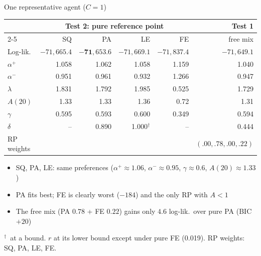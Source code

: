 \documentclass[aspectratio=169,11pt]{beamer}
\newcommand{\ap}{\alpha^{+}}
\newcommand{\am}{\alpha^{-}}
\newcommand{\bd}{\ensuremath{^{\dagger}}}
\newcommand{\tabnote}[1]{\par\vfill{\scriptsize\color{muted}#1\par}}
\newcommand{\tight}{\setlength{\itemsep}{3pt}}
\begin{document}
\begin{frame}{One representative agent ($C=1$)}
{\centering\footnotesize
\begin{tabular}{l rrrr r}
\toprule
& \multicolumn{4}{c}{Test 2: pure reference point} & Test 1\\
\cmidrule(lr){2-5}
& SQ & PA & LE & FE & free mix\\
\midrule
Log-lik. & $-71{,}665.4$ & $\mathbf{-71{,}653.6}$ & $-71{,}669.1$ & $-71{,}837.4$ & $-71{,}649.1$\\
$\ap$ & 1.058 & 1.062 & 1.058 & 1.159 & 1.040\\
$\am$ & 0.951 & 0.961 & 0.932 & 1.266 & 0.947\\
$\lambda$ & 1.831 & 1.792 & 1.985 & 0.525 & 1.729\\
$A(20)$ & 1.33 & 1.33 & 1.36 & 0.72 & 1.31\\
$\gamma$ & 0.595 & 0.593 & 0.600 & 0.349 & 0.594\\
$\delta$ & -- & 0.890 & 1.000\bd & -- & 0.444\\
RP weights & & & & & $(.00,.78,.00,.22)$\\
\bottomrule
\end{tabular}\par}
\begin{itemize}\small\tight
  \item SQ, PA, LE: same preferences ($\ap\approx 1.06$, $\am\approx 0.95$, $\gamma\approx 0.6$, $A(20)\approx 1.33$)
  \item PA fits best; FE is clearly worst ($-184$) and the only RP with $A<1$
  \item The free mix (PA $0.78$ + FE $0.22$) gains only $4.6$ log-lik.\ over pure PA (BIC $+20$)
\end{itemize}
\tabnote{\bd\ at a bound. $r$ at its lower bound except under pure FE (0.019). RP weights: SQ, PA, LE, FE.}
\end{frame}
\end{document}
